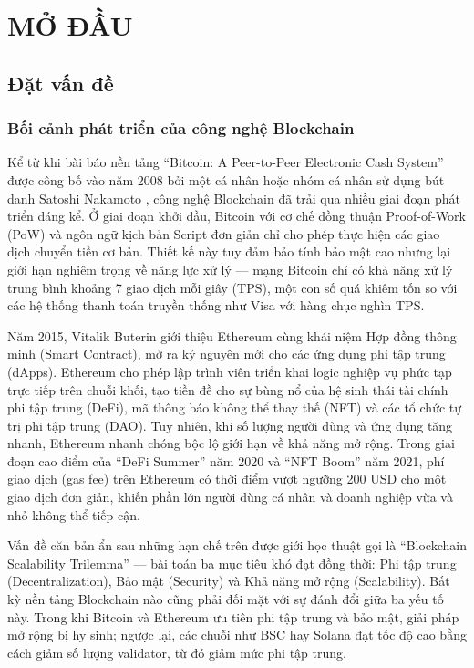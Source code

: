 \chapter{MỞ ĐẦU}

\section{Đặt vấn đề}

\subsection{Bối cảnh phát triển của công nghệ Blockchain}

Kể từ khi bài báo nền tảng ``Bitcoin: A Peer-to-Peer Electronic Cash System'' được công bố vào năm 2008 bởi một cá nhân hoặc nhóm cá nhân sử dụng bút danh Satoshi Nakamoto \cite{nakamoto2008bitcoin}, công nghệ Blockchain đã trải qua nhiều giai đoạn phát triển đáng kể. Ở giai đoạn khởi đầu, Bitcoin với cơ chế đồng thuận Proof-of-Work (PoW) và ngôn ngữ kịch bản Script đơn giản chỉ cho phép thực hiện các giao dịch chuyển tiền cơ bản. Thiết kế này tuy đảm bảo tính bảo mật cao nhưng lại giới hạn nghiêm trọng về năng lực xử lý --- mạng Bitcoin chỉ có khả năng xử lý trung bình khoảng 7 giao dịch mỗi giây (TPS), một con số quá khiêm tốn so với các hệ thống thanh toán truyền thống như Visa với hàng chục nghìn TPS.

Năm 2015, Vitalik Buterin giới thiệu Ethereum \cite{buterin2014ethereum} cùng khái niệm Hợp đồng thông minh (Smart Contract), mở ra kỷ nguyên mới cho các ứng dụng phi tập trung (dApps). Ethereum cho phép lập trình viên triển khai logic nghiệp vụ phức tạp trực tiếp trên chuỗi khối, tạo tiền đề cho sự bùng nổ của hệ sinh thái tài chính phi tập trung (DeFi), mã thông báo không thể thay thế (NFT) và các tổ chức tự trị phi tập trung (DAO). Tuy nhiên, khi số lượng người dùng và ứng dụng tăng nhanh, Ethereum nhanh chóng bộc lộ giới hạn về khả năng mở rộng. Trong giai đoạn cao điểm của ``DeFi Summer'' năm 2020 và ``NFT Boom'' năm 2021, phí giao dịch (gas fee) trên Ethereum có thời điểm vượt ngưỡng 200 USD cho một giao dịch đơn giản, khiến phần lớn người dùng cá nhân và doanh nghiệp vừa và nhỏ không thể tiếp cận.

Vấn đề căn bản ẩn sau những hạn chế trên được giới học thuật gọi là ``Blockchain Scalability Trilemma'' --- bài toán ba mục tiêu khó đạt đồng thời: Phi tập trung (Decentralization), Bảo mật (Security) và Khả năng mở rộng (Scalability). Bất kỳ nền tảng Blockchain nào cũng phải đối mặt với sự đánh đổi giữa ba yếu tố này. Trong khi Bitcoin và Ethereum ưu tiên phi tập trung và bảo mật, giải pháp mở rộng bị hy sinh; ngược lại, các chuỗi như BSC hay Solana đạt tốc độ cao bằng cách giảm số lượng validator, từ đó giảm mức phi tập trung.

